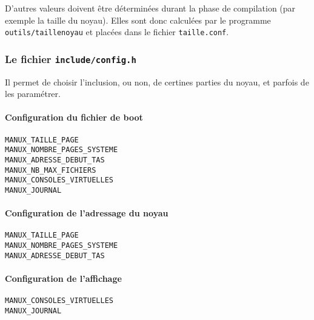    D'autres valeurs doivent être déterminées durant la phase de
compilation (par exemple la taille du noyau). Elles sont donc
calculées par le programme {\tt outils/taillenoyau} et placées dans le
fichier {\tt taille.conf}.

%
\subsubsection{Le fichier {\tt include/config.h}}

   Il permet de choisir l'inclusion, ou non, de certines parties du
noyau, et parfois de les paramétrer.

%
%
%
\paragraph{Configuration du fichier de boot}

\begin{description}
   \item[{\tt MANUX\_TAILLE\_PAGE}]
   \item[{\tt MANUX\_NOMBRE\_PAGES\_SYSTEME}]
   \item[{\tt MANUX\_ADRESSE\_DEBUT\_TAS}]
   \item[{\tt MANUX\_NB\_MAX\_FICHIERS}]
   \item[{\tt MANUX\_CONSOLES\_VIRTUELLES}]
   \item[{\tt MANUX\_JOURNAL}]
\end{description}

%
%
%
\paragraph{Configuration de l'adressage du noyau}
\begin{description}
   \item[{\tt MANUX\_TAILLE\_PAGE}]
   \item[{\tt MANUX\_NOMBRE\_PAGES\_SYSTEME}]
   \item[{\tt MANUX\_ADRESSE\_DEBUT\_TAS}]
\end{description}

%
%
%
\paragraph{Configuration de l'affichage}

\begin{description}
   \item[{\tt MANUX\_CONSOLES\_VIRTUELLES}]
   \item[{\tt MANUX\_JOURNAL}]
\end{description}


